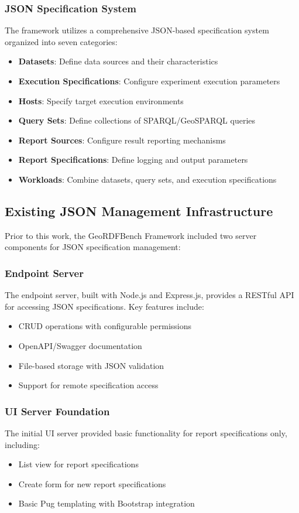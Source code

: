 \documentclass[11pt,a4paper]{article}
\begin{document}
\subsubsection{JSON Specification System}
The framework utilizes a comprehensive JSON-based specification system organized into seven categories:
\begin{itemize}
    \item \textbf{Datasets}: Define data sources and their characteristics
    \item \textbf{Execution Specifications}: Configure experiment execution parameters
    \item \textbf{Hosts}: Specify target execution environments
    \item \textbf{Query Sets}: Define collections of SPARQL/GeoSPARQL queries
    \item \textbf{Report Sources}: Configure result reporting mechanisms
    \item \textbf{Report Specifications}: Define logging and output parameters
    \item \textbf{Workloads}: Combine datasets, query sets, and execution specifications
\end{itemize}

\subsection{Existing JSON Management Infrastructure}

Prior to this work, the GeoRDFBench Framework included two server components for JSON specification management:

\subsubsection{Endpoint Server}
The endpoint server, built with Node.js and Express.js, provides a RESTful API for accessing JSON specifications. Key features include:
\begin{itemize}
    \item CRUD operations with configurable permissions
    \item OpenAPI/Swagger documentation
    \item File-based storage with JSON validation
    \item Support for remote specification access
\end{itemize}

\subsubsection{UI Server Foundation}
The initial UI server provided basic functionality for report specifications only, including:
\begin{itemize}
    \item List view for report specifications
    \item Create form for new report specifications
    \item Basic Pug templating with Bootstrap integration
\end{itemize}
\end{document}
